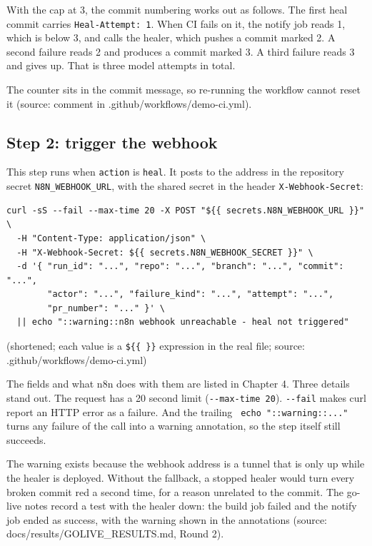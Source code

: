With the cap at 3, the commit numbering works out as follows. The first heal commit carries \texttt{Heal-\allowbreak{}Attempt:\allowbreak{} 1}. When CI fails on it, the notify job reads 1, which is below 3, and calls the healer, which pushes a commit marked 2. A second failure reads 2 and produces a commit marked 3. A third failure reads 3 and gives up. That is three model attempts in total.

The counter sits in the commit message, so re-running the workflow cannot reset it (source: comment in .github/\allowbreak{}workflows/\allowbreak{}demo-ci.yml).

\subsection{Step 2: trigger the webhook}

This step runs when \texttt{action} is \texttt{heal}. It posts to the address in the repository secret \texttt{N8N\_\allowbreak{}WEBHOOK\_\allowbreak{}URL}, with the shared secret in the header \texttt{X-\allowbreak{}Webhook-\allowbreak{}Secret}:

\begin{lstlisting}
curl -sS --fail --max-time 20 -X POST "${{ secrets.N8N_WEBHOOK_URL }}" \
  -H "Content-Type: application/json" \
  -H "X-Webhook-Secret: ${{ secrets.N8N_WEBHOOK_SECRET }}" \
  -d '{ "run_id": "...", "repo": "...", "branch": "...", "commit": "...",
        "actor": "...", "failure_kind": "...", "attempt": "...",
        "pr_number": "..." }' \
  || echo "::warning::n8n webhook unreachable - heal not triggered"
\end{lstlisting}

(shortened; each value is a \texttt{\$\{\{ \}\}} expression in the real file; source: .github/\allowbreak{}workflows/\allowbreak{}demo-ci.yml)

The fields and what n8n does with them are listed in Chapter 4. Three details stand out. The request has a 20 second limit (\texttt{-\allowbreak{}-\allowbreak{}max-\allowbreak{}time 20}). \texttt{-\allowbreak{}-\allowbreak{}fail} makes curl report an HTTP error as a failure. And the trailing \texttt{\textbar{}\textbar{} echo ":\allowbreak{}:\allowbreak{}warning:\allowbreak{}:\allowbreak{}.\allowbreak{}.\allowbreak{}.\allowbreak{}"} turns any failure of the call into a warning annotation, so the step itself still succeeds.

The warning exists because the webhook address is a tunnel that is only up while the healer is deployed. Without the fallback, a stopped healer would turn every broken commit red a second time, for a reason unrelated to the commit. The go-live notes record a test with the healer down: the build job failed and the notify job ended as success, with the warning shown in the annotations (source: docs/\allowbreak{}results/\allowbreak{}GOLIVE\_\allowbreak{}RESULTS.md, Round 2).

